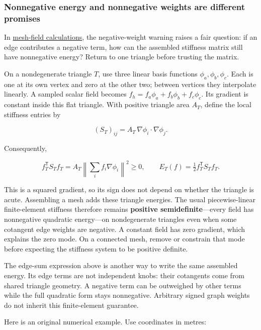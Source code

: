\subsubsection{Nonnegative energy and nonnegative weights are different promises}\label{03-visual-computing-i-ch002-nonnegative-energy-and-nonnegative-weights-are-different-promises}

\hypertarget{03-visual-computing-i-ch002-nonnegative-energy-and-nonnegative-weights-are-different-promises}{}

In \hyperref[appendix-1988d465c119]{mesh-field calculations}, the negative-weight warning raises a fair question: if an edge contributes a negative term, how can the assembled stiffness matrix still have nonnegative energy? Return to one triangle before trusting the matrix.

On a nondegenerate triangle \(T\), use three linear basis functions \(\phi_a,\phi_b,\phi_c\). Each is one at its own vertex and zero at the other two; between vertices they interpolate linearly. A sampled scalar field becomes \(f_h=f_a\phi_a+f_b\phi_b+f_c\phi_c\). Its gradient is constant inside this flat triangle. With positive triangle area \(A_T\), define the local stiffness entries by

\[
(S_T)_{ij}=A_T\,\nabla\phi_i\cdot\nabla\phi_j.
\]

Consequently,

\[
f_T^{\mathsf T}S_Tf_T
=A_T\left\|\sum_i f_i\nabla\phi_i\right\|^2\geq0,
\qquad E_T(f)=\tfrac12f_T^{\mathsf T}S_Tf_T.
\]

This is a squared gradient, so its sign does not depend on whether the triangle is acute. Assembling a mesh adds these triangle energies. The usual piecewise-linear finite-element stiffness therefore remains \textbf{positive semidefinite}---every field has nonnegative quadratic energy---on nondegenerate triangles even when some cotangent edge weights are negative. A constant field has zero gradient, which explains the zero mode. On a connected mesh, remove or constrain that mode before expecting the stiffness system to be positive definite.

The edge-sum expression above is another way to write the same assembled energy. Its edge terms are not independent knobs: their cotangents come from shared triangle geometry. A negative term can be outweighed by other terms while the full quadratic form stays nonnegative. Arbitrary signed graph weights do not inherit this finite-element guarantee.

Here is an original numerical example. Use coordinates in metres:

